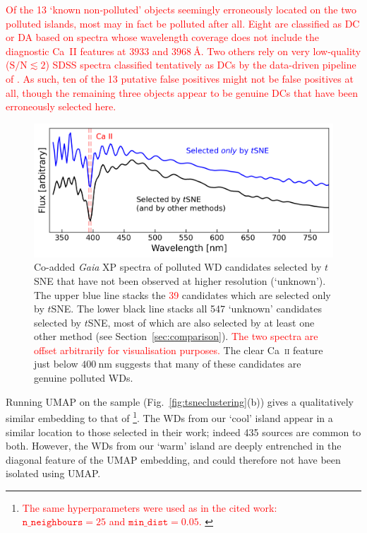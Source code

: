\documentclass[fleqn,usenatbib]{rasti}
\newcommand{\red}[1]{\textcolor{red}{#1}}
\begin{document}
\red{
Of the 13 `known non-polluted' objects seemingly erroneously located on the two polluted islands, most may in fact be polluted after all.
Eight are classified as DC or DA based on spectra whose wavelength coverage does not include the diagnostic Ca~\textsc{II} features at $3933$ and $3968~\text{\AA}$.
Two others rely on very low-quality ($\mathrm{S/N}\lesssim2$) SDSS spectra classified tentatively as DCs by the data-driven pipeline of \citet{vincent23}.
As such, ten of the 13 putative false positives might not be false positives at all, though the remaining three objects appear to be genuine DCs that have been erroneously selected here.
}

\begin{figure}
\centering
\includegraphics[width=\textwidth]{figures/fig3_coaddedspectrum.png}
\caption{
    Co-added \textit{Gaia} XP spectra of polluted WD candidates selected by $t$SNE that have not been observed at higher resolution (`unknown').
    The upper blue line stacks the \red{39} candidates which are selected only by $t$SNE.
    The lower black line stacks all 547 `unknown' candidates selected by $t$SNE, most of which are also selected by at least one other method (see Section~\ref{sec:comparison}).
    \red{The two spectra are offset arbitrarily for visualisation purposes.}
    The clear Ca~\textsc{ii} feature just below $400~\text{nm}$ suggests that many of these candidates are genuine polluted WDs.
}
\label{fig:coaddedspectrum}
\end{figure}

Running UMAP on the sample (Fig.~\ref{fig:tsneclustering}(b)) gives a qualitatively similar embedding to that of \citet[cf.\ their fig.~2]{kao24}\footnote{
    \red{
        The same hyperparameters were used as in the cited work: $\mathtt{n\_neighbours}=25$ and $\mathtt{min\_dist}=0.05$.
    }
}.
The WDs from our `cool' island appear in a similar location to those selected in their work; indeed 435 sources are common to both.
However, the WDs from our `warm' island are deeply entrenched in the diagonal feature of the UMAP embedding, and could therefore not have been isolated using UMAP.
\end{document}
